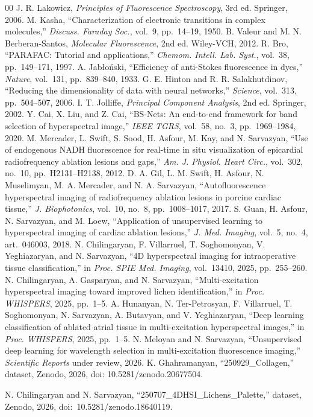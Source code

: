 \documentclass{article}
\begin{document}
\begin{thebibliography}{00}
 J. R. Lakowicz, \emph{Principles of Fluorescence Spectroscopy},
3rd ed. Springer, 2006.
 M. Kasha, ``Characterization of electronic transitions in complex
molecules,'' \emph{Discuss. Faraday Soc.}, vol.~9, pp.~14--19, 1950.
 B. Valeur and M. N. Berberan-Santos, \emph{Molecular Fluorescence},
2nd ed. Wiley-VCH, 2012.
 R. Bro, ``PARAFAC: Tutorial and applications,'' \emph{Chemom. Intell. Lab. Syst.}, vol.~38, pp.~149--171, 1997.
 A. Jab\l{}o\'nski, ``Efficiency of anti-Stokes fluorescence in
dyes,'' \emph{Nature}, vol.~131, pp.~839--840, 1933.
 G. E. Hinton and R. R. Salakhutdinov, ``Reducing the dimensionality
of data with neural networks,'' \emph{Science}, vol.~313, pp.~504--507, 2006.
 I. T. Jolliffe, \emph{Principal Component Analysis}, 2nd ed.
Springer, 2002.
 Y. Cai, X. Liu, and Z. Cai, ``BS-Nets: An end-to-end framework for
band selection of hyperspectral image,'' \emph{IEEE TGRS},
vol.~58, no.~3, pp.~1969--1984, 2020.
 M. Mercader, L. Swift, S. Sood, H. Asfour, M. Kay, and
N. Sarvazyan, ``Use of endogenous NADH fluorescence for real-time in situ visualization
of epicardial radiofrequency ablation lesions and gaps,'' \emph{Am. J. Physiol. Heart Circ.}, vol.~302, no.~10, pp.~H2131--H2138, 2012.
 D. A. Gil, L. M. Swift, H. Asfour, N. Muselimyan, M. A. Mercader, and
N. A. Sarvazyan, ``Autofluorescence hyperspectral imaging of radiofrequency ablation
lesions in porcine cardiac tissue,'' \emph{J. Biophotonics}, vol.~10, no.~8,
pp.~1008--1017, 2017.
 S. Guan, H. Asfour, N. Sarvazyan, and M. Loew, ``Application of
unsupervised learning to hyperspectral imaging of cardiac ablation lesions,'' \emph{J.
Med. Imaging}, vol.~5, no.~4, art.~046003, 2018.
 N. Chilingaryan, F. Villarruel, T. Soghomonyan, V. Yeghiazaryan, and
N. Sarvazyan, ``4D hyperspectral imaging for intraoperative tissue classification,'' in
\emph{Proc. SPIE Med. Imaging}, vol.~13410, 2025, pp.~255--260.
 N. Chilingaryan, A. Gasparyan, and N. Sarvazyan, ``Multi-excitation
hyperspectral imaging toward improved lichen identification,'' in \emph{Proc. WHISPERS}, 2025, pp.~1--5.
 A. Hunanyan, N. Ter-Petrosyan, F. Villarruel, T. Soghomonyan,
N. Sarvazyan, A. Butavyan, and V. Yeghiazaryan, ``Deep learning classification of ablated
atrial tissue in multi-excitation hyperspectral images,'' in \emph{Proc. WHISPERS}, 2025, pp.~1--5.
 N. Meloyan and N. Sarvazyan, ``Unsupervised deep learning for
wavelength selection in multi-excitation fluorescence imaging,'' \emph{Scientific Reports}
under review, 2026.
 K. Ghahramanyan, ``250929\_Collagen,'' dataset, Zenodo, 2026, doi: 10.5281/zenodo.20677504.
 \raggedright N. Chilingaryan and N. Sarvazyan, ``250707\_\allowbreak 4DHSI\_\allowbreak Lichens\_\allowbreak Palette,'' dataset, Zenodo, 2026, doi:~10.5281/\allowbreak zenodo.18640119.
\end{thebibliography}
\end{document}
